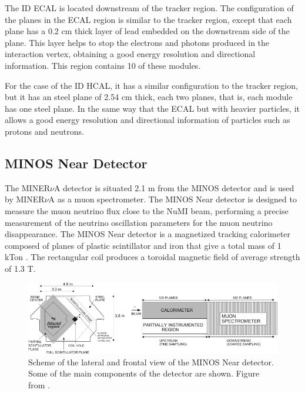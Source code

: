 \begin{itemize}
    The ID ECAL is located downstream of the tracker region. The configuration of the planes in the ECAL region is similar to the tracker region, except that each plane has a 0.2 cm thick layer of lead embedded on the downstream side of the plane. This layer helps to stop the electrons and photons produced in the interaction vertex, obtaining a good energy resolution and directional information. This region contains 10 of these modules. 

    For the case of the ID HCAL, it has a similar configuration to the tracker region, but it has an steel plane of 2.54 cm thick, each two planes, that is, each module has one steel plane. In the same way that the ECAL but with heavier particles, it allows a good energy resolution and directional information of particles such as protons and neutrons. 
    
\end{itemize}

\subsection{MINOS Near Detector}
\label{Cap:MnvExp:MnvDetector:MINOS}

The MINER$\nu$A detector is situated 2.1 m from the MINOS detector and is used by MINER$\nu$A as a muon spectrometer. The MINOS Near detector is designed to measure the muon neutrino flux close to the NuMI beam, performing a precise measurement of the neutrino oscillation parameters for the muon neutrino disappearance. The MINOS Near detector is a magnetized tracking calorimeter composed of planes of plastic scintillator and iron that give a total mass of 1 kTon \cite{MINOSpaper}. The rectangular coil produces a toroidal magnetic field of average strength of 1.3 T.

\begin{figure}
    \centering
    \includegraphics[scale=0.9]{Figures/Chapter2/MINOSNDScheme.jpg}
    \caption{Scheme of the lateral and frontal view of the MINOS Near detector. Some of the main components of the detector are shown. Figure from \cite{MINERvA}.}
    \label{fig:MnvExp:MnvDetector:SchemeMINOSND}
\end{figure}

